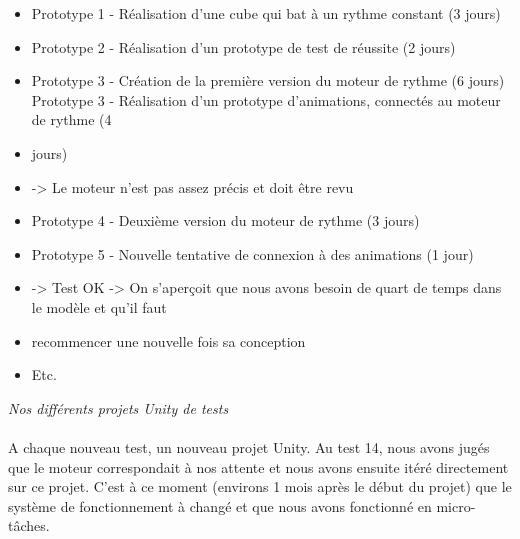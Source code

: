 \begin{itemize}
\item Prototype 1 - Réalisation d’une cube qui bat à un rythme constant (3 jours)
\item Prototype 2 - Réalisation d’un prototype de test de réussite (2 jours)
\item Prototype 3 - Création de la première version du moteur de rythme (6 jours)
Prototype 3 - Réalisation d’un prototype d’animations, connectés au moteur de rythme (4 \item jours)
\item -> Le moteur n’est pas assez précis et doit être revu
\item Prototype 4 - Deuxième version du moteur de rythme (3 jours)
\item Prototype 5 - Nouvelle tentative de connexion à des animations (1 jour)
\item -> Test OK
-> On s’aperçoit que nous avons besoin de quart de temps dans le modèle et qu’il faut \item recommencer une nouvelle fois sa conception
\item Etc.
\end{itemize}

\noindent
{}
\begin{center}
\textit{Nos différents projets Unity de tests
}
\end{center}

\paragraph{}
A chaque nouveau test, un nouveau projet Unity. Au test 14, nous avons jugés que le moteur correspondait à nos attente et nous avons ensuite itéré directement sur ce projet. C’est à ce moment (environs 1 mois après le début du projet) que le système de fonctionnement à changé et que nous avons fonctionné en micro-tâches.

